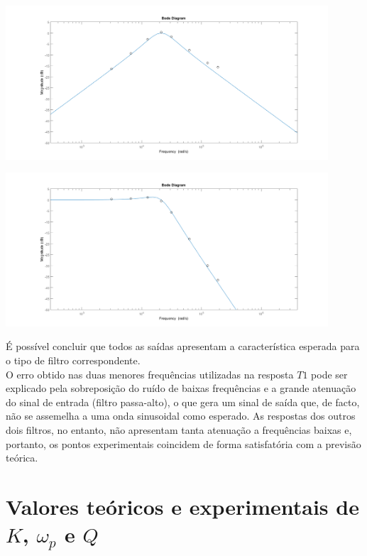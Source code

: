 \documentclass[a4paper,11pt]{report}
\begin{document}
\begin{center}
     \includegraphics[angle=0,width=0.9\textwidth]{KHNT2exp.png}
     \label{fig:KHNT2exp}
     \end{center}
     
     \begin{center}
     \includegraphics[angle=0,width=0.9\textwidth]{KHNT3exp.png}
     \label{fig:KHNT3exp}
     \end{center}


É possível concluir que todos as saídas apresentam a característica esperada para o tipo de filtro correspondente.\\
\indent O erro obtido nas duas menores frequências utilizadas na resposta $T1$ pode ser explicado pela sobreposição do ruído de baixas frequências e a grande atenuação do sinal de entrada (filtro passa-alto), o que gera um sinal de saída que, de facto, não se assemelha a uma onda sinusoidal como esperado. As respostas dos outros dois filtros, no entanto, não apresentam tanta atenuação a frequências baixas e, portanto, os pontos experimentais coincidem de forma satisfatória com a previsão teórica.
\section{Valores teóricos e experimentais de $K$, $\omega_p$ e $Q$}
\end{document}
